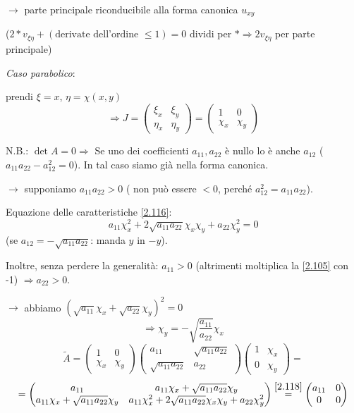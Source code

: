 \documentclass[a4paper,11pt]{report}
\begin{document}
$\rightarrow$ parte principale riconducibile alla forma canonica $u_{xy}$ 

($2 * v_{\xi\eta} + (\text{derivate dell'ordine }\leq1) =0$ dividi per $* \Rightarrow 2v_{\xi \eta}$ per parte principale)

\medskip

\emph{Caso parabolico}:

prendi $\xi=x$, $\eta=\chi(x,y)$
\[
\Rightarrow J=\left(\begin{matrix}
\xi_x & \xi_y \\
\eta_x & \eta_y
\end{matrix}\right)=\left( \begin{matrix}
1 & 0\\
\chi_{x} & \chi_y
\end{matrix}\right)
\]

N.B.: $\det A=0 \Rightarrow$ Se uno dei coefficienti $a_{11}, a_{22}$ \`e nullo lo \`e anche $a_{12}$ ($a_{11}a_{22}-a_{12}^2=0$). In tal caso siamo già nella forma canonica.

$\rightarrow $ supponiamo $a_{11}a_{22}>0$ ( non pu\`o essere $<0$, perch\'e $a_{12}^2 = a_{11}a_{22}$).

Equazione delle caratteristiche \eqref{2.116}:
\[
a_{11}\chi_x^2+2\sqrt{a_{11}a_{22}}\chi_x\chi_y + a_{22}\chi_y^2 =0
\]
(se $a_{12}=-\sqrt{a_{11}a_{22}}$: manda $y$ in $-y$).

Inoltre, senza perdere la generalit\`a: $a_{11}>0$ (altrimenti moltiplica la \eqref{2.105} con -1) $\Rightarrow a_{22}>0$.

$\rightarrow$ abbiamo $(\sqrt{a_{11}}\chi_x + \sqrt{a_{22}}\chi_y)^2=0$
\begin{equation}
\Rightarrow\chi_y = - \sqrt{\frac{a_{11}}{a_{22}}}\chi_x
\label{2.118}
\end{equation}
\[
\tilde{A}=\left(\begin{matrix}
1 & 0\\
\chi_x & \chi_y
\end{matrix}\right)\left(\begin{matrix}
a_{11} & \sqrt{a_{11}a_{22}}\\
\sqrt{a_{11}a_{22}} & a_{22}
\end{matrix}\right)\left(\begin{matrix}
1 & \chi_x \\
0 & \chi_y
\end{matrix}\right)=
\]
\[
=\left(\begin{matrix}
a_{11} & a_{11}\chi_x + \sqrt{a_{11}a_{22}}\chi_y \\
a_{11}\chi_x + \sqrt{a_{11}a_{22}}\chi_y & a_{11}\chi_x^2 + 2\sqrt{a_{11}a_{22}}\chi_x\chi_y + a_{22}\chi_y^2
\end{matrix}\right)\overset{\eqref{2.118}}{=}\left(\begin{matrix}
a_{11} & 0\\
0 & 0
\end{matrix}\right)
\]
\end{document}
